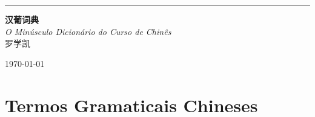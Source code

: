 \documentclass[a4paper,12pt,twoside,openany]{memoir}
\makeatletter
\def\fake@makechapterhead#1{%
  \vspace*{50\p@}%
  {\parindent \z@ \raggedright \normalfont
    \ifnum \c@secnumdepth >\m@ne
        \huge\bfseries \strut%
        \par\nobreak
        \vskip 20\p@
    \fi
    \interlinepenalty\@M
    \Huge \bfseries #1\par\nobreak
    \vskip 40\p@
  }
  \markboth{#1}{\thechapter}
}
\newcommand{\newchapterhead}{\let\@makechapterhead\fake@makechapterhead}
\makeatother
\begin{document}
\newchapterhead

\begin{titlingpage} %
	
	\raggedleft %
	
	\rule{1pt}{\textheight} %
	\hspace{0.05\textwidth} %
	\parbox[b]{0.75\textwidth}{ %
		
		{\Huge\bfseries 汉葡词典}\\[2\baselineskip] %
		{\large\textit{O Minúsculo Dicionário do Curso de Chinês}}\\[4\baselineskip] %
		{\Large\textsc{罗学凯}} %
		
		\vspace{0.5\textheight} %
		
		{\noindent \today}\\[\baselineskip] %
	}

\end{titlingpage}

\tableofcontents

\newpage

\chapter{Termos Gramaticais Chineses}
\end{document}
